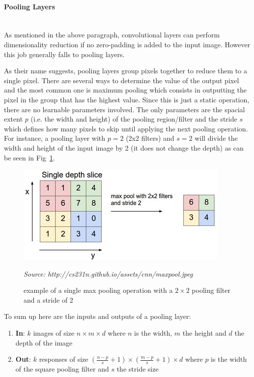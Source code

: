 \documentclass[12pt,twoside]{article}
\newcommand{\source}[1]{\vspace{-3pt} \caption*{ \footnotesize{\textit{Source: {#1}}}} }
\newcommand{\para}[1]{\paragraph{#1}\mbox{}\\}
\begin{document}
\para{Pooling Layers}  

As mentioned in the above paragraph, convolutional layers can perform
dimensionality reduction if no zero-padding is added to the input image.
However this job generally falls to pooling layers.

As their name suggests, pooling layers group pixels together to reduce them to a
single pixel. There are several ways to determine the value of the output pixel
and the most common one is maximum pooling which consists in outputting the
pixel in the group that has the highest value. Since this is just a static
operation, there are no learnable parameters involved. The only parameters are
the spacial extent $p$ (i.e. the width and height) of the pooling region/filter and
the stride $s$ which defines how many pixels to skip until applying the next
pooling operation. For instance, a pooling layer with $p=2$ (2x2 filters) and
$s=2$ will divide the width and height of the input image by 2 (it does not
change the depth) as can be seen in Fig~\ref{fig:maxpool}.

\begin{figure}[ht]
  \centering
  \includegraphics[scale=0.7]{./figures/maxpool.jpeg}
  \caption{example of a single max pooling operation with a $2 \times 2$ pooling
  filter and a stride of 2}
  \source{http://cs231n.github.io/assets/cnn/maxpool.jpeg}
  \label{fig:maxpool}
\end{figure}

To sum up here are the inputs and outputs of a pooling layer:

\begin{enumerate}
  \item \textbf{In}: $k$ images of size $n \times m \times d$ where $n$ is the
    width, $m$ the height and $d$ the depth of the image
  \item \textbf{Out}: $k$ responses of size $\left( \frac{n-p}{s} + 1  \right)\times
    \left( \frac{m-p}{s}+1  \right)\times d$ where $p$ is the width of the
    square pooling filter and $s$ the stride size
\end{enumerate}
\end{document}
